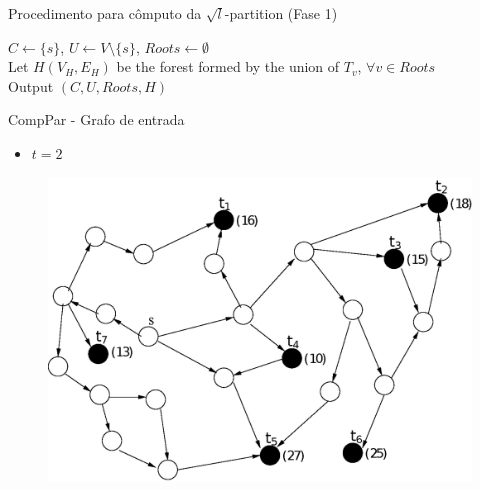 \documentclass[10pt]{beamer}
\begin{document}
\begin{frame}{Procedimento para cômputo da $\sqrt{l}$-partition (Fase 1)}
\begin{algorithm}[H]
\label{alg:compute_partition}
$C \gets \lbrace s \rbrace$, $U \gets V \setminus \lbrace s \rbrace$, $Roots \gets \emptyset$\\
Let $H(V_H,E_H)$ be the forest formed by the union of $T_v$, $\forall v \in Roots$\\
Output $(C,U,Roots, H)$
\caption{CompPar(G=(V, E), s, k)} 
\end{algorithm}
\end{frame}

\begin{frame}{CompPar - Grafo de entrada}
\begin{itemize}
  \item $t = 2$
\end{itemize}
\begin{figure}[H]
\centering
\includegraphics[scale=0.45]{imagens/compPar}
\label{fig:fig}
\end{figure}
\end{frame}
\end{document}
